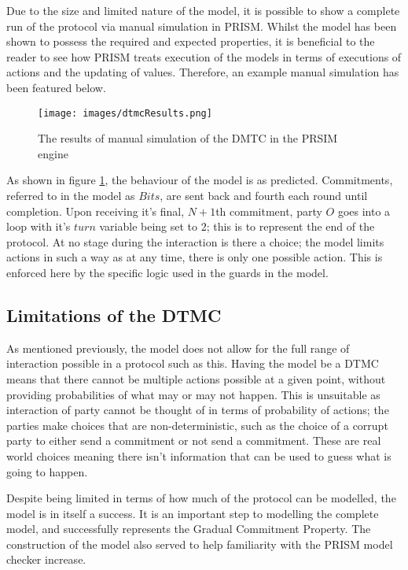 \documentclass{l4proj}
\begin{document}
Due to the size and limited nature of the model, it is possible to show a complete run of the protocol via manual simulation in PRISM. Whilst the model has been shown to possess the required and expected properties, it is beneficial to the reader to see how PRISM treats execution of the models in terms of executions of actions and the updating of values. Therefore, an example manual simulation has been featured below.

\begin{figure}[h!]
\centering
\texttt{[image: images/dtmcResults.png]}
\caption{The results of manual simulation of the DMTC in the PRSIM engine}
\label{dtmcEx}
\end{figure}

As shown in figure \ref{dtmcEx}, the behaviour of the model is as predicted. Commitments, referred to in the model as $Bits$, are sent back and fourth each round until completion. Upon receiving it's final, $N+1$th commitment, party $O$ goes into a loop with it's $turn$ variable being set to 2; this is to represent the end of the protocol. 
At no stage during the interaction is there a choice; the model limits actions in such a way as at any time, there is only one possible action. This is enforced here by the specific logic used in the guards in the model.

\subsection{Limitations of the DTMC}

As mentioned previously, the model does not allow for the full range of interaction possible in a protocol such as this. Having the model be a DTMC means that there cannot be multiple actions possible at a given point, without providing probabilities of what may or may not happen. This is unsuitable as interaction of party cannot be thought of in terms of probability of actions; the parties make choices that are non-deterministic, such as the choice of a corrupt party to either send a commitment or not send a commitment. These are real world choices meaning there isn't information that can be used to guess what is going to happen. 

Despite being limited in terms of how much of the protocol can be modelled, the model is in itself a success. It is an important step to modelling the complete model, and successfully represents the Gradual Commitment Property. The construction of the model also served to help familiarity with the PRISM model checker increase.
\end{document}
